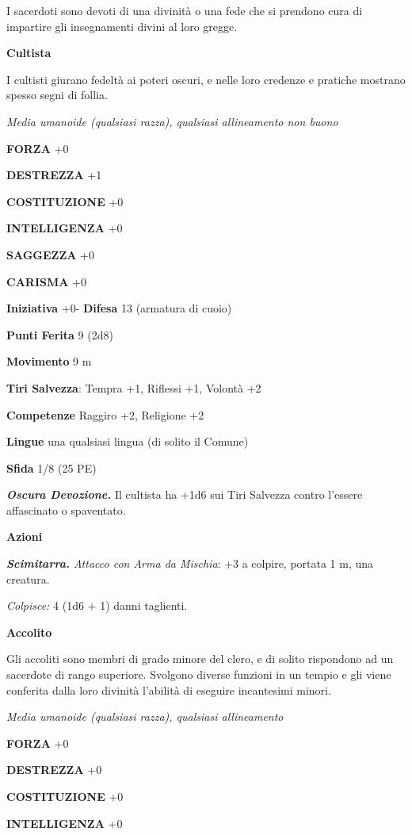 \begin{multicols}{2}
I sacerdoti sono devoti di una divinità o una fede che si prendono cura di impartire gli insegnamenti divini al loro gregge.

\medskip\textbf{Cultista}

I cultisti giurano fedeltà ai poteri oscuri, e nelle loro credenze e pratiche mostrano spesso segni di follia.

\emph{Media umanoide (qualsiasi razza), qualsiasi allineamento non buono}

\textbf{FORZA} +0

\textbf{DESTREZZA} +1

\textbf{COSTITUZIONE} +0

\textbf{INTELLIGENZA} +0

\textbf{SAGGEZZA} +0

\textbf{CARISMA} +0

\textbf{Iniziativa} +0- \textbf{Difesa} 13 (armatura di cuoio)

\textbf{Punti Ferita} 9 (2d8)

\textbf{Movimento} 9 m

\textbf{Tiri Salvezza}: Tempra +1, Riflessi +1, Volontà +2 

\textbf{Competenze} Raggiro +2, Religione +2

\textbf{Lingue} una qualsiasi lingua (di solito il Comune)

\textbf{Sfida} 1/8 (25 PE)

\emph{\textbf{Oscura Devozione.}} Il cultista ha +1d6 sui Tiri Salvezza contro l'essere affascinato o spaventato.

\textbf{Azioni}

\emph{\textbf{Scimitarra.} Attacco con Arma da Mischia}: +3 a colpire, portata 1 m, una creatura.

\emph{Colpisce:} 4 (1d6 + 1) danni taglienti.

\medskip\textbf{Accolito}

Gli accoliti sono membri di grado minore del clero, e di solito rispondono ad un sacerdote di rango superiore. Svolgono diverse funzioni in un tempio e gli viene conferita dalla loro divinità l'abilità di eseguire incantesimi minori.

\emph{Media umanoide (qualsiasi razza), qualsiasi allineamento}

\textbf{FORZA} +0

\textbf{DESTREZZA} +0

\textbf{COSTITUZIONE} +0

\textbf{INTELLIGENZA} +0


\end{multicols}
